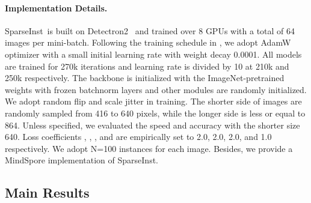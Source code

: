 \documentclass[10pt,twocolumn,letterpaper]{article}
\newcommand{\name}{SparseInst}
\begin{document}
\paragraph{Implementation Details.}
\label{expr_details}
\name~is built on  Detectron2~\cite{wu2019detectron2} and trained over 8 GPUs with a total of 64 images per mini-batch. Following the training schedule in \cite{peize2020onenet}, we adopt AdamW~\cite{LoshchilovH19} optimizer with a small initial learning rate  with weight decay 0.0001. All models are trained for 270k iterations and learning rate is divided by 10 at 210k and 250k respectively. The backbone is initialized with the ImageNet-pretrained weights with frozen batchnorm layers and other modules are randomly initialized. We adopt random flip and scale jitter in training. The shorter side of images are randomly sampled from 416 to 640 pixels, while the longer side is less or equal to 864. Unless specified, we evaluated the speed and accuracy with the shorter size 640. Loss coefficients , , , and  are empirically set to 2.0, 2.0, 2.0, and 1.0 respectively. We adopt N=100 instances for each image. Besides, we provide a MindSpore \cite{mindspore} implementation of \name{}.


\subsection{Main Results}
\end{document}
